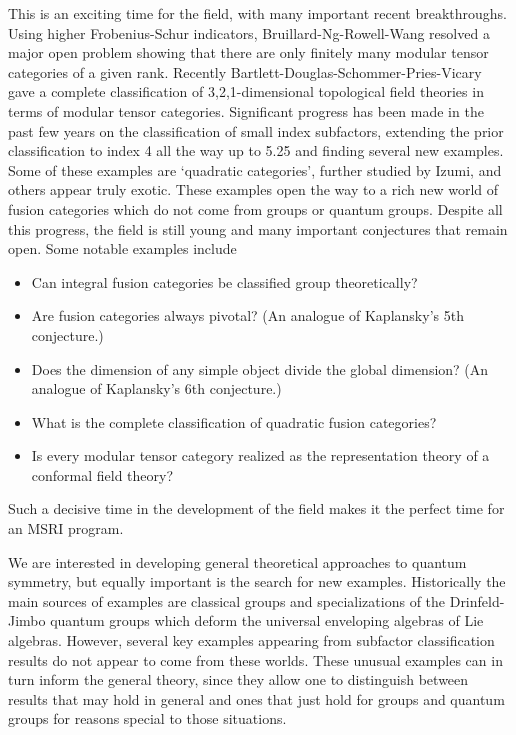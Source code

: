\documentclass[11pt]{article}
\begin{document}
This is an exciting time for the field, with many important recent breakthroughs. Using higher Frobenius-Schur indicators, Bruillard-Ng-Rowell-Wang resolved a major open problem showing that there are only finitely many modular tensor categories of a given rank. Recently Bartlett-Douglas-Schommer-Pries-Vicary gave a complete classification of 3,2,1-dimensional topological field theories in terms of modular tensor categories. Significant progress has been made in the past few years on the classification of small index subfactors, extending the prior classification to index 4 all the way up to 5.25 and finding several new examples. Some of these examples are `quadratic categories', further studied by Izumi, and others appear truly exotic. These examples open the way to a rich new world of fusion categories which do not come from groups or quantum groups.  Despite all this progress, the field is still young and many important conjectures that remain open. Some notable examples include
\begin{itemize}
  \setlength{\itemsep}{1pt}
  \setlength{\parskip}{0pt}
  \setlength{\parsep}{0pt}
\item Can integral fusion categories  be classified group theoretically?
\item Are fusion categories always pivotal? (An analogue of Kaplansky's 5th conjecture.)
\item Does the dimension of any simple object divide the global dimension? (An analogue of Kaplansky's 6th conjecture.)
\item What is the complete classification of quadratic fusion categories?
\item Is every modular tensor category realized as the representation theory of a conformal field theory?
\end{itemize}
Such a decisive time in the development of the field makes it the perfect time for an MSRI program.

We are interested in developing general theoretical approaches to quantum symmetry, but equally important is the search for new examples. Historically the main sources of examples are classical groups and specializations of the Drinfeld-Jimbo quantum groups which deform the universal enveloping algebras of Lie algebras. However, several key examples appearing from subfactor classification results do not appear to come from these worlds. These unusual examples can in turn inform the general theory, since they allow one to distinguish between results that may hold in general and ones that just hold for groups and quantum groups for reasons special to those situations.
\end{document}
